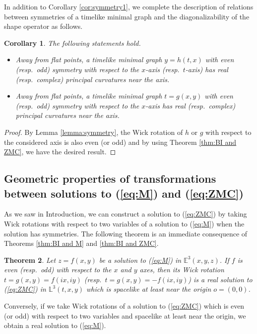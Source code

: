 \documentclass[12pt,amstex]{amsart}%
\theoremstyle{plain} %
\newtheorem{theorem}{Theorem}[section]
\newtheorem{corollary}[theorem]{Corollary}
\theoremstyle{definition}
\begin{document}
In addition to Corollary \ref{cor:symmetry1}, we complete the description of relations between symmetries of a timelike minimal graph and the diagonalizability of the shape operator as follows.
\begin{corollary}\label{cor:symmetry2}
The following statements hold.
\begin{itemize}
 \item[(i)]Away from flat points, a timelike minimal graph $y=h(t,x)$ with even (resp.\ odd) symmetry with respect to the $x$-axis (resp.\ $t$-axis) has real (resp.\ complex) principal curvatures near the axis.
\item[(ii)]Away from flat points, a timelike minimal graph $t=g(x,y)$ with even (resp.\ odd) symmetry with respect to the $x$-axis has real (resp.\ complex) principal curvatures  near the axis.
\end{itemize}
\end{corollary}
\begin{proof}
By Lemma \ref{lemma:symmetry}, the Wick rotation of $h$ or $g$ with respect to the considered axis is also even (or odd) and by using Theorem \ref{thm:BI and ZMC}, we have the desired result.
\end{proof}

\subsection{Geometric properties of transformations between solutions to (\ref{eq:M}) and (\ref{eq:ZMC})}
As we saw in Introduction, we can construct a solution to (\ref{eq:ZMC}) by taking Wick rotations with respect to two variables of a solution to (\ref{eq:M}) when the solution has symmetries. The following theorem is an immediate consequence of Theorems \ref{thm:BI and M} and \ref{thm:BI and ZMC}.
\begin{theorem}\label{thm:M and ZMC}
Let $z=f(x,y)$ be a solution to (\ref{eq:M}) in $\mathbb{E}^3(x,y,z)$. If $f$ is even (resp.\ odd) with respect to the $x$ and $y$ axes, then its Wick rotation $t=g(x,y)=f(ix,iy)$  (resp.\ $t=g(x,y)=-f(ix,iy)$) is a real solution to (\ref{eq:ZMC}) in $\mathbb{L}^3(t,x,y)$ which is spacelike at least near the origin $o=(0,0)$.

\end{theorem}
Conversely, if we take Wick rotations of a solution to (\ref{eq:ZMC}) which is even (or odd) with respect to two variables and spacelike at least near the origin, we obtain a real solution to (\ref{eq:M}).
\end{document}
